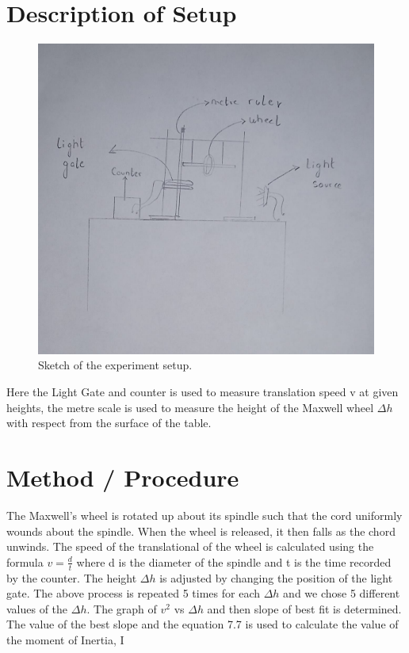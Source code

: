 \section{Description of Setup}
\begin{figure}[h!]
    \centering
    \includegraphics[width=\textwidth]{figures/Sktech.jpeg}
    \caption{Sketch of the experiment setup.}
    \label{fig:yx}
\end{figure}
Here the Light Gate and counter is used to measure translation speed v at given heights, the metre scale is used to measure the height of the Maxwell wheel $\Delta h$ with respect from the surface of the table.
\section{Method / Procedure}
The Maxwell's wheel is rotated up about its spindle such that the cord uniformly wounds about the spindle. When the wheel is released, it then falls as the chord unwinds. The speed of the translational of the wheel is calculated using the formula $ v = \frac{d}{t}$ where d is the diameter of the spindle and t is the time recorded by the counter. The height $\Delta h$ is adjusted by changing the position of the light gate. The above process is repeated 5 times for each $\Delta h$ and we chose 5 different values of the $\Delta h$.  The graph of $v^2$ vs $\Delta h$ and then slope of best fit is determined. The value of the best slope and the equation 7.7 is used to calculate the value of the moment of Inertia, I
